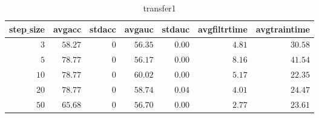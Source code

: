 \documentclass[]{article}
\begin{document}
\begin{table}[!tbp]
\caption{transfer1\label{transfer1}} 
{\centering
\begin{tabular}{rrrrrrr}
\hline\hline
\multicolumn{1}{c}{step$\_$size}&\multicolumn{1}{c}{avgacc}&\multicolumn{1}{c}{stdacc}&\multicolumn{1}{c}{avgauc}&\multicolumn{1}{c}{stdauc}&\multicolumn{1}{c}{avgfiltrtime}&\multicolumn{1}{c}{avgtraintime}\tabularnewline
\hline
$ 3$&$58.27$&$0$&$56.35$&$0.00$&$4.81$&$30.58$\tabularnewline
$ 5$&$78.77$&$0$&$56.17$&$0.00$&$8.16$&$41.54$\tabularnewline
$10$&$78.77$&$0$&$60.02$&$0.00$&$5.17$&$22.35$\tabularnewline
$20$&$78.77$&$0$&$58.74$&$0.04$&$4.01$&$24.47$\tabularnewline
$50$&$65.68$&$0$&$56.70$&$0.00$&$2.77$&$23.61$\tabularnewline
\hline
\end{tabular}}
\end{table}
\end{document}
